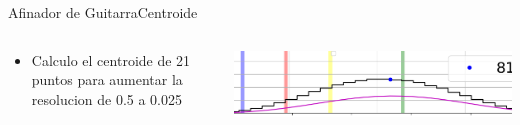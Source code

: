 \begin{frame}[t]{Afinador de Guitarra}{Centroide}
   \footnotesize
   \begin{columns}
      \begin{column}{.5\textwidth}
         \begin{itemize}
            \item{Calculo el centroide de 21 puntos para aumentar la resolucion de 0.5 a 0.025}
         \end{itemize}
      
      \end{column}
      \begin{column}{.5\textwidth}
         \includegraphics[width=1.0\textwidth]{7_clase/centroide}
      \end{column}
   \end{columns}
   \vfill
   \note{
      \begin{itemize}
         \item{}
         \item{}
      \end{itemize}
   }
\end{frame}
